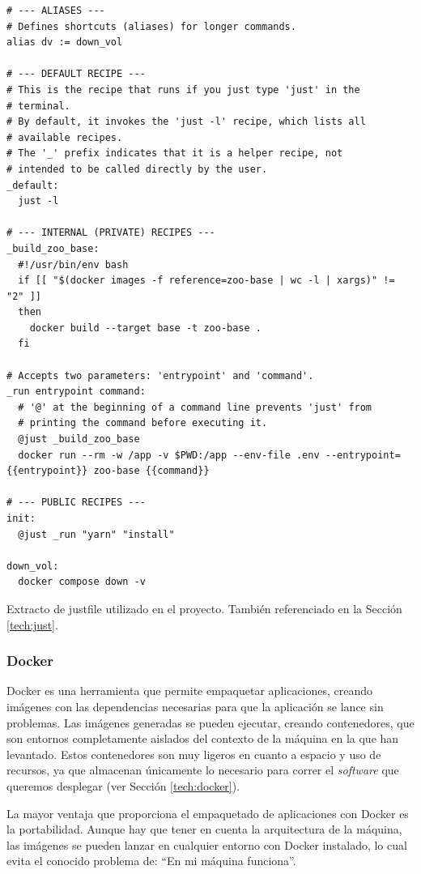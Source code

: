 \begin{listing}[!ht]
  \begin{verbatim}
# --- ALIASES ---
# Defines shortcuts (aliases) for longer commands.
alias dv := down_vol

# --- DEFAULT RECIPE ---
# This is the recipe that runs if you just type 'just' in the
# terminal.
# By default, it invokes the 'just -l' recipe, which lists all
# available recipes.
# The '_' prefix indicates that it is a helper recipe, not
# intended to be called directly by the user.
_default:
  just -l

# --- INTERNAL (PRIVATE) RECIPES ---
_build_zoo_base:
  #!/usr/bin/env bash
  if [[ "$(docker images -f reference=zoo-base | wc -l | xargs)" != "2" ]]
  then
    docker build --target base -t zoo-base .
  fi

# Accepts two parameters: 'entrypoint' and 'command'.
_run entrypoint command:
  # '@' at the beginning of a command line prevents 'just' from
  # printing the command before executing it.
  @just _build_zoo_base
  docker run --rm -w /app -v $PWD:/app --env-file .env --entrypoint={{entrypoint}} zoo-base {{command}}

# --- PUBLIC RECIPES ---
init:
  @just _run "yarn" "install"

down_vol:
  docker compose down -v
\end{verbatim}
\caption{Extracto de justfile utilizado en el proyecto. También referenciado en la Sección \ref{tech:just}.}
\label{lst:just}
\end{listing}

\subsubsection*{Docker}
\label{subsec:docker}

Docker es una herramienta que permite empaquetar aplicaciones, creando imágenes con las dependencias necesarias para que la aplicación se lance sin problemas. Las imágenes generadas se pueden ejecutar, creando contenedores, que son entornos completamente aislados del contexto de la máquina en la que han levantado. Estos contenedores son muy ligeros en cuanto a espacio y uso de recursos, ya que almacenan únicamente lo necesario para correr el \textit{software} que queremos desplegar (ver Sección \ref{tech:docker}).

La mayor ventaja que proporciona el empaquetado de aplicaciones con Docker es la portabilidad. Aunque hay que tener en cuenta la arquitectura de la máquina, las imágenes se pueden lanzar en cualquier entorno con Docker instalado, lo cual evita el conocido problema de: ``En mi máquina funciona''.


